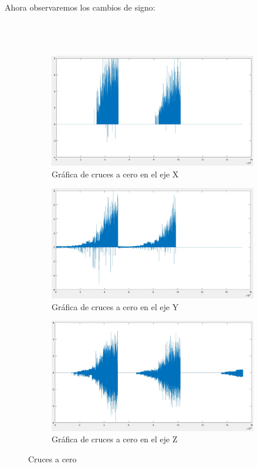 \documentclass[11pt,a4paper]{article}
\begin{document}
\\
Ahora observaremos los cambios de signo:
\\
\\
\\
\\
\begin{figure}[h!]
	\begin{subfigure}[b]{0.49\textwidth}
		\includegraphics[scale=0.20]{zero_cross_x}
		\caption{Gráfica de cruces a cero en el eje X}
		\label{fig:f1}
		\hfill
	\end{subfigure}
	\begin{subfigure}[b]{0.49\textwidth}
		\includegraphics[scale=0.20]{zero_cross_y}
		\caption{Gráfica de cruces a cero en el eje Y}
		\label{fig:f2}
		\hfill
	\end{subfigure}
	\begin{subfigure}[b]{1\textwidth}
		\includegraphics[scale=0.20]{zero_cross_z}
		\caption{Gráfica de cruces a cero en el eje Z}
		\label{fig:f3}
		\hfill
	\end{subfigure}
	\caption{Cruces a cero}
\end{figure}
\end{document}
